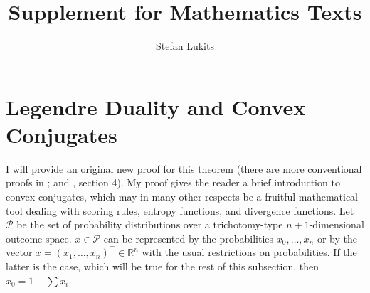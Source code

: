 \documentclass[12pt]{article}
\begin{document}

\title{Supplement for Mathematics Texts}
\author{Stefan Lukits}
\maketitle

\maketitle

\tableofcontents

\newpage

\section{Legendre Duality and Convex Conjugates}
\label{section:eiphaiwu}


I will provide an original new proof for this theorem (there are more
conventional proofs in ; and
, section 4). My proof gives the reader a brief
introduction to convex conjugates, which may in many other respects be
a fruitful mathematical tool dealing with scoring rules, entropy
functions, and divergence functions. Let $\mathcal{P}$ be the set of
probability distributions over a trichotomy-type $n+1$-dimensional
outcome space. $x\in\mathcal{P}$ can be represented by the
probabilities $x_{0},{\ldots},x_{n}$ or by the vector
$x=(x_{1},{\ldots},x_{n})^{\intercal}\in\mathbb{R}^{n}$ with the usual
restrictions on probabilities. If the latter is the case, which will
be true for the rest of this subsection, then $x_{0}=1-\sum{}x_{i}$.
\end{document}
